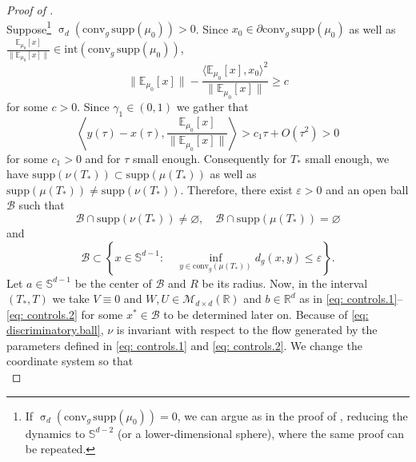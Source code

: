 \documentclass[a4paper,11pt]{article}
\theoremstyle{plain}
\newcommand{\supp}{\mathrm{supp}}
\newcommand{\conv}{\mathrm{conv}}
\renewcommand{\S}{\mathbb{S}^{d-1}}
\newcommand{\bW}{\bm{\mathit{W}}}
\newcommand{\bV}{\bm{\mathit{V}}}
\newcommand{\bU}{\bm{\mathit{U}}}
\renewcommand{\leq}{\leqslant}
\renewcommand{\geq}{\geqslant}
\numberwithin{equation}{section}
\newcommand{\nddrb}[1]{ {\text{{\bf drb:}} \color{magenta}{#1} } }
\begin{document}
\begin{proof}[Proof of ]
\begin{equation*}
\end{equation*}
Suppose\footnote{If $\upsigma_d(\conv_g\,\supp(\mu_0))=0$, we can argue as in the proof of , reducing the dynamics to $\mathbb{S}^{d-2}$ (or a lower-dimensional sphere), where the same proof can be repeated.}  $\upsigma_d(\conv_g \,\supp(\mu_0))>0$.
Since $x_0\in\partial\conv_g\,\supp(\mu_0)$ as well as $\frac{\mathbb{E}_{\mu_0}[x]}{\|\mathbb{E}_{\mu_0}[x]\|}\in \mathrm{int }(\mathrm{ conv}_g\,\supp(\mu_0))$,
\begin{equation*}
    \|\mathbb{E}_{\mu_0}[x]\|-\frac{\langle \mathbb{E}_{\mu_0}[x],x_0\rangle^2}{\|\mathbb{E}_{\mu_0}[x]\|}\geq c
\end{equation*}
for some $c>0$. Since $\gamma_1\in(0,1)$ we gather that
\begin{equation*}
\left\langle y(\tau)-x(\tau),\frac{\mathbb{E}_{\mu_0}
[x]}{\|\mathbb{E}_{\mu_0
}[x]\|}\right\rangle>c_1\tau+O(\tau^2)>0
\end{equation*}
for some $c_1>0$ and for $\tau$ small enough.
Consequently for $T_*$ small enough, we {have
$\supp(\nu(T_*))\subset\supp(\mu(T_*))$} as well as $\supp(\mu(T_*))\neq \supp(\nu(T_*))$. Therefore, there exist $\varepsilon>0$ and an open ball $\mathscr{B}$ such that
    \begin{equation}\label{eq: discriminatory.ball}
        \mathscr{B}\cap\supp(\nu(T_*))\neq \varnothing,\quad \mathscr{B}\cap \supp(\mu(T_*))=\varnothing
    \end{equation}
and
\begin{equation*}
    \mathscr{B}\subset \left\{ x\in \S: \quad \inf_{y\in \conv_g(\mu(T_*))}d_g(x,y)\leq \varepsilon\right\}.
\end{equation*}
    Let $a\in \S$ be the center of $\mathscr{B}$ and $R$ be its radius. Now, in the interval $(T_*,T)$ we take $\bV\equiv0$ and $\bW,\bU\in \mathscr{M}_{d\times d}(\mathbb{R})$ and $b\in \mathbb{R}^d$ as in \eqref{eq: controls.1}--\eqref{eq: controls.2}
    for some $x^*\in \mathscr{B}$ to be determined later on.  Because of \eqref{eq: discriminatory.ball}, $\nu$ is invariant with respect to the flow generated by the parameters defined in \eqref{eq: controls.1} and \eqref{eq: controls.2}. %
     We change the coordinate system so that
    \begin{equation*}

\end{equation*}
\end{proof}
\end{document}
